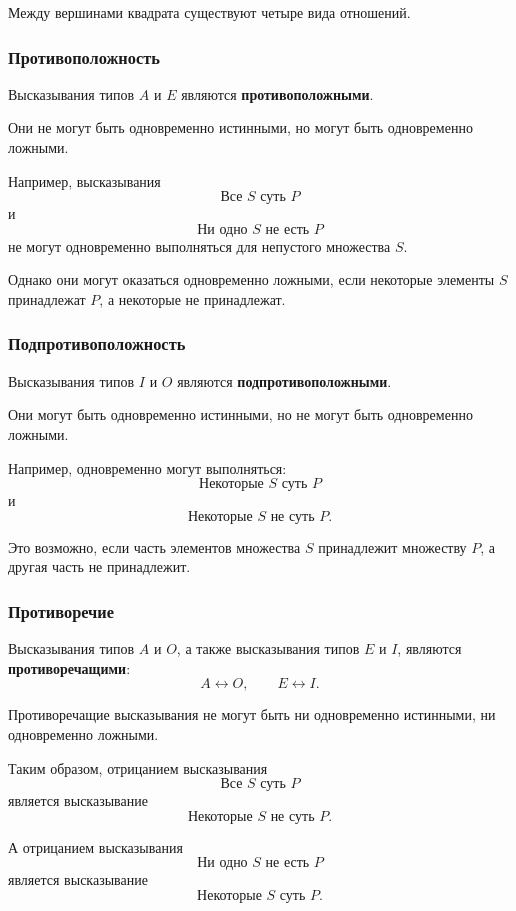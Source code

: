 \documentclass[12pt,a4paper,oneside,openany]{book}
\theoremstyle{definition}
\theoremstyle{plain}
\theoremstyle{remark}
\begin{document}
Между вершинами квадрата существуют четыре вида отношений.

\subsubsection{Противоположность}

Высказывания типов \(A\) и \(E\) являются
\textbf{противоположными}.

Они не могут быть одновременно истинными, но могут быть одновременно
ложными.

Например, высказывания
\[
\text{Все }S\text{ суть }P
\]
и
\[
\text{Ни одно }S\text{ не есть }P
\]
не могут одновременно выполняться для непустого множества \(S\).

Однако они могут оказаться одновременно ложными, если некоторые
элементы \(S\) принадлежат \(P\), а некоторые не принадлежат.

\subsubsection{Подпротивоположность}

Высказывания типов \(I\) и \(O\) являются
\textbf{подпротивоположными}.

Они могут быть одновременно истинными, но не могут быть одновременно
ложными.

Например, одновременно могут выполняться:
\[
\text{Некоторые }S\text{ суть }P
\]
и
\[
\text{Некоторые }S\text{ не суть }P.
\]

Это возможно, если часть элементов множества \(S\) принадлежит
множеству \(P\), а другая часть не принадлежит.

\subsubsection{Противоречие}

Высказывания типов \(A\) и \(O\), а также высказывания типов \(E\) и
\(I\), являются \textbf{противоречащими}:
\[
A\longleftrightarrow O,
\qquad
E\longleftrightarrow I.
\]

Противоречащие высказывания не могут быть ни одновременно истинными,
ни одновременно ложными.

Таким образом, отрицанием высказывания
\[
\text{Все }S\text{ суть }P
\]
является высказывание
\[
\text{Некоторые }S\text{ не суть }P.
\]

А отрицанием высказывания
\[
\text{Ни одно }S\text{ не есть }P
\]
является высказывание
\[
\text{Некоторые }S\text{ суть }P.
\]
\end{document}
